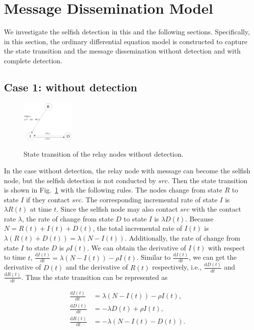 \section{Message Dissemination Model}
\label{sec:ode_model}
We investigate the selfish detection in this and the following sections.
Specifically, in this section, the ordinary differential equation model
is constructed to capture the state transition and the message dissemination
without detection and with complete detection.
\subsection{Case 1: without detection}
\label{subsec:wo_detc}
\begin{figure}
  \centering
  {\includegraphics[width=0.23\textwidth]
  {fig/state_transition_no_detect.eps}}
     \caption{State transition of the relay nodes without detection.}
     \label{fig:ss_wo_dt}
\end{figure}
In the case without detection,
the relay node with message can become the selfish node,
but the selfish detection is not conducted by $src$.
Then the state transition is shown
in Fig.~\ref{fig:ss_wo_dt} with the following rules.
The nodes change from state $R$ to state $I$ if they contact $src$.
The corresponding incremental rate of state $I$ is $\lambda R(t)$ at time $t$.
Since the selfish node may also contact $src$ with the contact rate $\lambda$,
the rate of change from state $D$ to state $I$ is $\lambda D(t)$.
Because $N=R(t)+I(t)+D(t)$,
the total incremental rate of $I(t)$ is
$\lambda (R(t)+D(t))=\lambda (N-I(t))$.
Additionally, the rate of change from state $I$ to state $D$ is $\rho I(t)$.
We can obtain the derivative of $I(t)$ with respect to time $t$,
$\frac{\mathrm{d} I(t)}{\mathrm{d} t} = \lambda (N-I(t)) - \rho I(t)$.
Similar to $\frac{\mathrm{d} I(t)}{\mathrm{d} t}$,
we can get the derivative of $D(t)$
and the derivative of $R(t)$ respectively,
i.e., $\frac{\mathrm{d} D(t)}{\mathrm{d} t}$ and
$\frac{\mathrm{d} R(t)}{\mathrm{d} t}$.
Thus the state transition can be represented as
\begin{small}
\begin{equation}
\label{eq:IDR_wo}
\begin{aligned}
\frac{\mathrm{d} I(t)}{\mathrm{d} t} &=  \lambda (N-I(t)) - \rho I(t),\\
\frac{\mathrm{d} D(t)}{\mathrm{d} t} &= - \lambda D(t) + \rho I(t),\\
\frac{\mathrm{d} R(t)}{\mathrm{d} t} &= - \lambda (N-I(t)-D(t)).
\end{aligned}
\end{equation}
\end{small}
